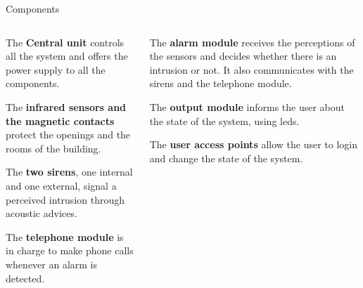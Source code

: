 \begin{frame}{Components}

  \begin{columns}
   \begin{column}{.50\textwidth}
    The {\textcolor{green!40!black}{\fontsize{13}{15}\textbf{Central unit}}}
    controls all the system and offers the power supply to all the components.
      \vskip 0.3cm

    The {\textcolor{green!40!black}{\fontsize{13}{15}\textbf{infrared sensors
    and the magnetic contacts}}}
    protect the openings and the rooms of the building.
      \vskip 0.3cm

    The {\textcolor{green!40!black}{\fontsize{13}{15}\textbf{two sirens}}},
    one internal and one external, signal a perceived intrusion through
    acoustic advices.

      \vskip 0.3cm

    The {\textcolor{green!40!black}{\fontsize{13}{15}\textbf{telephone module}}}
    is in charge to make phone calls whenever an alarm is detected.

   \end{column}

   \begin{column}{.50\textwidth}
    The {\textcolor{green!40!black}{\fontsize{13}{15}\textbf{alarm module}}}
    receives the perceptions of the sensors and decides whether there is
    an intrusion or not. It also communicates with the sirens and
    the telephone module.

     \vskip 0.3cm

    The {\textcolor{green!40!black}{\fontsize{13}{15}\textbf{output module}}}
    informs the user about the state of the system, using leds.

     \vskip 0.3cm

    The {\textcolor{green!40!black}{\fontsize{13}{15}\textbf{user access points}}}
    allow the user to login and change the state of the system.
   \end{column}
 \end{columns}

\end{frame}
